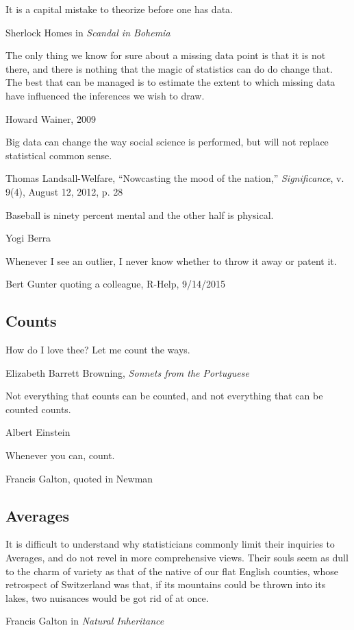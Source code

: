 \epigraph{It is a capital mistake to theorize before one has data.}{Sherlock Homes in \emph{Scandal in Bohemia}}


\epigraph{The only thing we know for sure about a missing data point is that it is not there, and there is nothing that the magic of statistics can do do change that.  The best that can be managed is to estimate the extent to which missing data have influenced the inferences we wish to draw.}{Howard Wainer, 2009}

\epigraph{Big data can change the way social science is performed, but will not replace statistical common sense.}{Thomas Landsall-Welfare, ``Nowcasting the mood of the nation,'' \emph{Significance}, v. 9(4), August 12, 2012, p. 28} 

\epigraph{Baseball is ninety percent mental and the other half is physical.}{Yogi Berra}

\epigraph{Whenever I see an outlier, I never know whether to throw it away or patent it.}{Bert Gunter quoting a colleague, R-Help, 9/14/2015}

\subsection{Counts}

\epigraph{How do I love thee? Let me count the ways.}{Elizabeth Barrett Browning, \emph{Sonnets from the Portuguese}}

\epigraph{Not everything that counts can be counted, and not everything that can be counted counts.}{Albert Einstein}

\epigraph{Whenever you can, count.}{Francis Galton, quoted in Newman}

\subsection{Averages}

\epigraph{It is difficult to understand why statisticians commonly limit their inquiries to Averages, and do not revel in more comprehensive views. Their souls seem as dull to the charm of variety as that of the native of our flat English counties, whose retrospect of Switzerland was that, if its mountains could be thrown into its lakes, two nuisances would be got rid of at once.}{Francis Galton in \emph{Natural Inheritance}}



